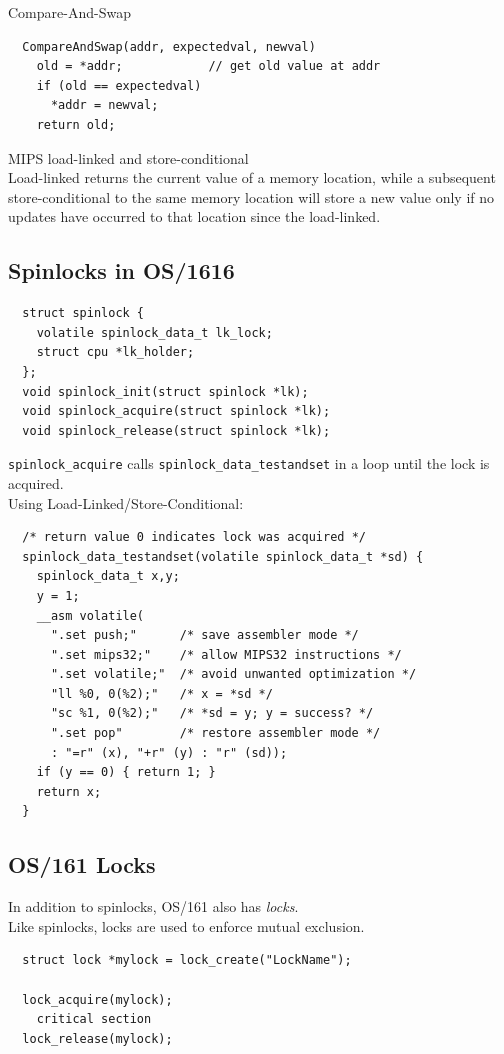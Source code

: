 \documentclass[12pt]{article}
\theoremstyle{plain}
\theoremstyle{definition}
\begin{document}
Compare-And-Swap
\begin{verbatim}
  CompareAndSwap(addr, expectedval, newval)
    old = *addr;            // get old value at addr
    if (old == expectedval)
      *addr = newval;
    return old;
\end{verbatim}

MIPS load-linked and store-conditional \\
Load-linked returns the current value of a memory location, while a subsequent store-conditional to the same memory location will store a new value only if no updates have occurred to that location since the load-linked.

\subsection{Spinlocks in OS/1616}
\begin{verbatim}
  struct spinlock {
    volatile spinlock_data_t lk_lock;
    struct cpu *lk_holder;
  };
  void spinlock_init(struct spinlock *lk);
  void spinlock_acquire(struct spinlock *lk);
  void spinlock_release(struct spinlock *lk);
\end{verbatim}
\texttt{spinlock\_acquire} calls \texttt{spinlock\_data\_testandset} in a loop until the lock is acquired. \\
Using Load-Linked/Store-Conditional:
\begin{verbatim}
  /* return value 0 indicates lock was acquired */
  spinlock_data_testandset(volatile spinlock_data_t *sd) {
    spinlock_data_t x,y;
    y = 1;
    __asm volatile(
      ".set push;"      /* save assembler mode */
      ".set mips32;"    /* allow MIPS32 instructions */
      ".set volatile;"  /* avoid unwanted optimization */
      "ll %0, 0(%2);"   /* x = *sd */
      "sc %1, 0(%2);"   /* *sd = y; y = success? */
      ".set pop"        /* restore assembler mode */
      : "=r" (x), "+r" (y) : "r" (sd));
    if (y == 0) { return 1; }
    return x;
  }
\end{verbatim}

\subsection{OS/161 Locks}
In addition to spinlocks, OS/161 also has \emph{locks}. \\
Like spinlocks, locks are used to enforce mutual exclusion.
\begin{verbatim}
  struct lock *mylock = lock_create("LockName");

  lock_acquire(mylock);
    critical section
  lock_release(mylock);
\end{verbatim}
\end{document}
